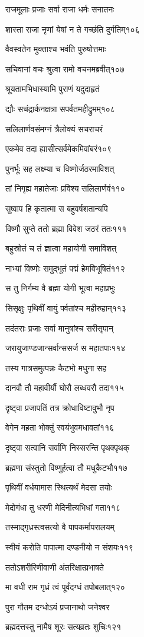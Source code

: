 राजमूलाः प्रजाः सर्वा राजा धर्मः सनातनः

शास्ता राजा नृणां येषां न ते गच्छंति दुर्गतिम्१०६

वैवस्वतेन मुक्ताश्च भवंति पुरुषोत्तमाः

सचिवानां वचः श्रुत्वा रामो वचनमब्रवीत्१०७

श्रूयतामभिधास्यामि पुराणं यदुदाहृतं

द्यौः सचंद्रार्कनक्षत्रा सपर्वतमहीद्रुमम्१०८

सलिलार्णवसंमग्नं त्रैलोक्यं सचराचरं

एकमेव तदा ह्यासीत्सर्वमेकमिवांबरं१०९

पुनर्भूः सह लक्ष्म्या च विष्णोर्जठरमाविशत्

तां निगृह्य महातेजाः प्रविश्य सलिलार्णवं११०

सुष्वाप हि कृतात्मा स बहुवर्षशतान्यपि

विष्णौ सुप्ते ततो ब्रह्मा विवेश जठरं ततः१११

बहुस्रोतं च तं ज्ञात्वा महायोगी समाविशत्

नाभ्यां विष्णोः समुद्भूतं पद्मं हेमविभूषितं११२

स तु निर्गम्य वै ब्रह्मा योगी भूत्वा महाप्रभुः

सिसृक्षुः पृथिवीं वायुं पर्वतांश्च महीरुहान्११३

तदंतराः प्रजाः सर्वा मानुषांश्च सरीसृपान्

जरायुजाण्डजान्सर्वान्ससर्ज स महातपाः११४

तस्य गात्रसमुत्पन्नः कैटभो मधुना सह

दानवौ तौ महावीर्यौ घोरौ लब्धवरौ तदा११५

दृष्ट्वा प्रजापतिं तत्र क्रोधाविष्टावुभौ नृप

वेगेन महता भोक्तुं स्वयंभुवमधावतां११६

दृष्ट्वा सत्वानि सर्वाणि निस्सरन्ति पृथक्पृथक्

ब्रह्मणा संस्तुतो विष्णुर्हत्वा तौ मधुकैटभौ११७

पृथिवीं वर्धयामास स्थित्यर्थं मेदसा तयोः

मेदोगंधा तु धरणी मेदिनीत्यभिधां गता११८

तस्माद्गृध्रस्त्वसत्यो वै पापकर्मापरालयम्

स्वीयं करोति पापात्मा दण्डनीयो न संशयः११९

ततोऽशरीरिणीवाणी अंतरिक्षात्प्रभाषते

मा वधी राम गृध्रं त्वं पूर्वंदग्धं तपोबलात्१२०

पुरा गौतम दग्धोऽयं प्रजानाथो जनेश्वर

ब्रह्मदत्तस्तु नामैष शूरः सत्यव्रतः शुचिः१२१

